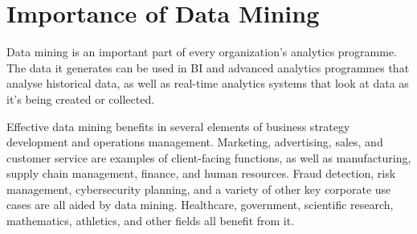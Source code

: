 \documentclass[12pt,letterpaper]{article}
\begin{document}
\section{Importance of Data Mining}
Data mining is an important part of every organization's analytics programme. The data it generates can be used in BI and advanced analytics programmes that analyse historical data, as well as real-time analytics systems that look at data as it's being created or collected.

Effective data mining benefits in several elements of business strategy development and operations management. Marketing, advertising, sales, and customer service are examples of client-facing functions, as well as manufacturing, supply chain management, finance, and human resources. Fraud detection, risk management, cybersecurity planning, and a variety of other key corporate use cases are all aided by data mining. Healthcare, government, scientific research, mathematics, athletics, and other fields all benefit from it.
\end{document}

